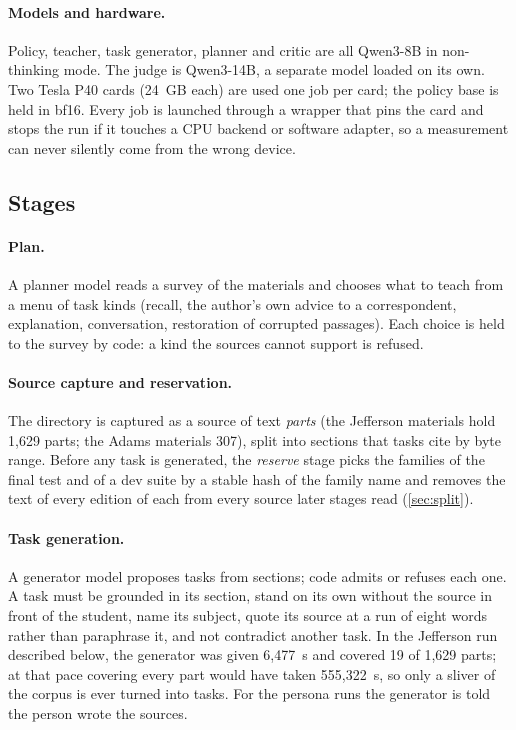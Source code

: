 \paragraph{Models and hardware.}
Policy, teacher, task generator, planner and critic are all Qwen3-8B in non-thinking mode.
The judge is Qwen3-14B, a separate model loaded on its own. Two Tesla P40 cards (24~GB each) are used one job per card; the policy base is held in bf16.
Every job is launched through a wrapper that pins the card and stops the run if it
touches a CPU backend or software adapter, so a measurement can never silently come from
the wrong device.

\subsection{Stages}

\paragraph{Plan.}
A planner model reads a survey of the materials and chooses what to teach from a menu
of task kinds (recall, the author's own advice to a correspondent, explanation, conversation,
restoration of corrupted passages). Each choice is held to the survey by code: a kind
the sources cannot support is refused.

\paragraph{Source capture and reservation.}
The directory is captured as a source of text \emph{parts} (the Jefferson materials hold
1,629 parts; the Adams materials 307), split into sections that tasks cite by byte range.
Before any task is generated, the \emph{reserve} stage picks the families of the final test
and of a dev suite by a stable hash of the family name and removes the text of every edition
of each from every source later stages read (\cref{sec:split}).

\paragraph{Task generation.}
A generator model proposes tasks from sections; code admits or refuses each one. A task
must be grounded in its section, stand on its own without the source in front of the
student, name its subject, quote its source at a run of eight words rather than
paraphrase it, and not contradict another task. In the Jefferson run described below,
the generator was given 6,477~s and covered 19 of 1,629 parts; at that pace covering every
part would have taken 555,322~s, so only a sliver of the corpus is ever turned into tasks.
For the persona runs the generator is told the person wrote the sources.

